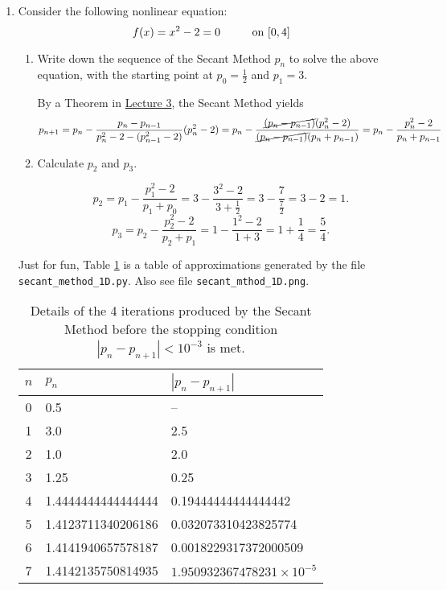 \documentclass[11pt,oneside,english,reqno]{amsart}
\theoremstyle{definition}
\newcommand{\pspace}{\hspace{10mm}}
\newcommand{\1}{\mathbbm{1}}
\begin{document}
\begin{enumerate}[leftmargin=*]
\begin{enumerate}
\end{enumerate}

\pagebreak














\item Consider the following nonlinear equation:
\[
f(x)=x^2-2=0\pspace\text{on }[0,4]
\]
\begin{enumerate}
\itemsep5mm

\item Write down the sequence of the Secant Method $p_n$ to solve the above equation, with the starting point at $p_0=\frac{1}{2}$ and $p_1=3$.

By a Theorem in \href{https://discord.com/channels/927293874534248449/927293874534248452/930338504620269619}{Lecture 3}, the Secant Method yields
\begin{equation}\label{eq:SM1}
p_{n+1}=p_n-\frac{p_n-p_{n-1}}{p_n^2-2-(p_{n-1}^2-2)}(p_n^2-2)=p_n-\frac{\cancel{(p_n-p_{n-1})}(p_n^2-2)}{\cancel{(p_n-p_{n-1})}(p_n+p_{n-1})}=p_n-\frac{p_n^2-2}{p_n+p_{n-1}}
\end{equation}


\item Calculate $p_2$ and $p_3$.

\[
p_2=p_1-\frac{p_1^2-2}{p_1+p_0}=3-\frac{3^2-2}{3+\frac{1}{2}}=3-\frac{7}{\frac{7}{2}}=3-2=1.
\]
\[
p_3=p_2-\frac{p_2^2-2}{p_2+p_1}=1-\frac{1^2-2}{1+3}=1+\frac{1}{4}=\frac{5}{4}.
\]
\end{enumerate}

Just for fun, Table \ref{tbl:SM1} is a table of approximations generated by the file \verb!secant_method_1D.py!. Also see file \verb!secant_mthod_1D.png!.

\begin{table}[H]
\centering
\caption{Details of the 4 iterations produced by the Secant Method before the stopping condition $|p_{n}-p_{n+1}|<10^{-3}$ is met.}\label{tbl:SM1}
\vspace{3mm}
\begin{tabular}{|c|l|l|}
\hline
$n$ & $p_n$ & $|p_{n}-p_{n+1}|$ \\
\hline
0 & 0.5 & -- \\[2mm]
1 &  3.0 & 2.5 \\[2mm]
2 & 1.0 & 2.0 \\[2mm]
3 & 1.25 & 0.25 \\[2mm]
4 & 1.4444444444444444 & 0.19444444444444442 \\[2mm]
5 & 1.4123711340206186 & 0.032073310423825774 \\[2mm]
6 & 1.4141940657578187 & 0.0018229317372000509 \\[2mm]
7 & 1.4142135750814935 & $1.950932367478231\times10^{-5}$ \\[2mm]
\hline
\end{tabular}
\end{table}




\end{enumerate}
\end{document}

